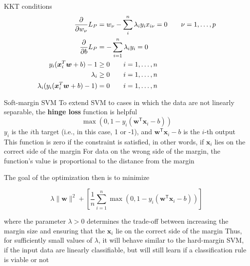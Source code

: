 \documentclass[aspectratio=169]{beamer}\usepackage[]{graphicx}\usepackage[]{xcolor}
\begin{document}
\begin{frame}{KKT conditions}
    \begin{align*}
        \frac{\partial}{\partial w_\nu}L_P &=
        w_\nu-\sum_{i}^n\lambda_iy_ix_{i\nu}=0
        \qquad\nu=1,\ldots,p \\
        \frac{\partial}{\partial b}L_P &=
        -\sum_{i=1}^n \lambda_iy_i = 0 \\
        y_i(\bm{x}_i^T\bm{w}+b)-1 &\geq 0\qquad i=1,\ldots,n \\
        \lambda_i &\geq 0\qquad i=1,\ldots,n \\
        \lambda_i(y_i(\bm{x}_i^T\bm{w}+b)-1) &=0\qquad i=1,\ldots,n \\
    \end{align*}
\end{frame}


    
\begin{frame}{Soft-margin SVM}
    To extend SVM to cases in which the data are not linearly separable, the \textbf{hinge loss} function is helpful
    \[
        \max\left(0, 1 - y_i(\mathbf{w}^\mathsf{T} \mathbf{x}_i - b)\right)
    \]
    \vfill
    $y_i$ is the $i$th target (i.e., in this case, 1 or -1), and $\mathbf{w}^\mathsf{T} \mathbf{x}_i - b$ is the $i$-th output
    \vfill
    This function is zero if the constraint is satisfied, in other words, if $\mathbf{x}_i$ lies on the correct side of the margin
    \vfill 
    For data on the wrong side of the margin, the function's value is proportional to the distance from the margin
\end{frame}

\begin{frame}
   
    The goal of the optimization then is to minimize
    
    \[ 
        \lambda \lVert \mathbf{w} \rVert^2 +\left[\frac 1 n \sum_{i=1}^n \max\left(0, 1 - y_i(\mathbf{w}^\mathsf{T} \mathbf{x}_i - b)\right) \right]
    \]
    
    where the parameter $\lambda > 0$ determines the trade-off between increasing the margin size and ensuring that the $\mathbf{x}_i$ lie on the correct side of the margin
    \vfill
    Thus, for sufficiently small values of $\lambda$, it will behave similar to the hard-margin SVM, if the input data are linearly classifiable, but will still learn if a classification rule is viable or not
\end{frame}
\end{document}
